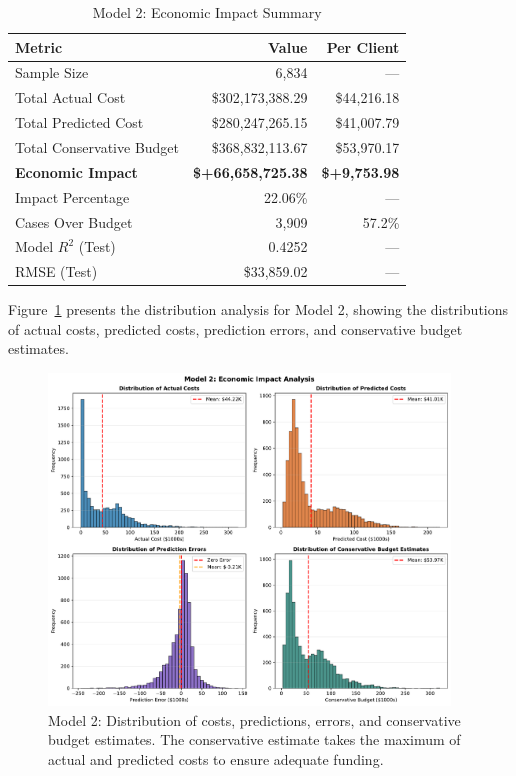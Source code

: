 \begin{table}[htbp]
\centering
\small
\caption{Model 2: Economic Impact Summary}
\label{tab:model2_impact_summary}
\begin{tabular}{lrr}
\toprule
\textbf{Metric} & \textbf{Value} & \textbf{Per Client} \\
\midrule
Sample Size & 6,834 & --- \\
\midrule
Total Actual Cost & \$302,173,388.29 & \$44,216.18 \\
Total Predicted Cost & \$280,247,265.15 & \$41,007.79 \\
Total Conservative Budget & \$368,832,113.67 & \$53,970.17 \\
\midrule
\textbf{Economic Impact} & \textbf{\$+66,658,725.38} & \textbf{\$+9,753.98} \\
Impact Percentage & 22.06\% & --- \\
\midrule
Cases Over Budget & 3,909 & 57.2\% \\
\midrule
Model $R^2$ (Test) & 0.4252 & --- \\
RMSE (Test) & \$33,859.02 & --- \\
\bottomrule
\end{tabular}
\end{table}

Figure~\ref{fig:model2_impact_histograms} presents the distribution analysis for Model 2, showing the distributions of actual costs, predicted costs, prediction errors, and conservative budget estimates.

\begin{figure}[htbp]
\centering
\includegraphics[width=0.95\textwidth]{figures/model_2_Impact_Histograms.pdf}
\caption{Model 2: Distribution of costs, predictions, errors, and conservative budget estimates. The conservative estimate takes the maximum of actual and predicted costs to ensure adequate funding.}
\label{fig:model2_impact_histograms}
\end{figure}

